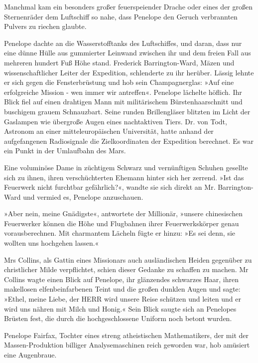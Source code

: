 \bigpar

Manchmal kam ein besonders großer feuerspeiender Drache oder eines
der großen Sternenräder dem Luftschiff so nahe, dass Penelope den
Geruch verbrannten Pulvers zu riechen glaubte.

Penelope dachte an die Wasserstofftanks des Luftschiffes, und
daran, dass nur eine dünne Hülle aus gummierter Leinwand zwischen
ihr und dem freien Fall aus mehreren hundert Fuß Höhe stand.
Frederick Barrington-Ward, Mäzen und wissenschaftlicher Leiter der
Expedition, schlenderte zu ihr herüber. Lässig lehnte er sich gegen
die Fensterbrüstung und hob sein Champagnerglas: »Auf eine
erfolgreiche Mission - wen immer wir antreffen«. Penelope lächelte
höflich. Ihr Blick fiel auf einen drahtigen Mann mit militärischem
Bürstenhaarschnitt und buschigem grauem Schnauzbart. Seine runden
Brillengläser blitzten im Licht der Gaslampen wie übergroße Augen
eines nachtaktiven Tiers. Dr. von Todt, Astronom an einer
mitteleuropäischen Universität, hatte anhand der aufgefangenen
Radiosignale die Zielkoordinaten der Expedition berechnet. Es war
ein Punkt in der Umlaufbahn des Mars.

Eine voluminöse Dame in züchtigem Schwarz und vernünftigen Schuhen
gesellte sich zu ihnen, ihren verschüchterten Ehemann hinter sich
her zerrend. »Ist das Feuerwerk nicht furchtbar gefährlich?«,
wandte sie sich direkt an Mr. Barrington-Ward und vermied es,
Penelope anzuschauen.

»Aber nein, meine Gnädigste«, antwortete der Millionär, »unsere
chinesischen Feuerwerker können die Höhe und Flugbahnen ihrer
Feuerwerkskörper genau vorausberechnen. Mit charmantem Lächeln
fügte er hinzu: »Es sei denn, sie wollten uns hochgehen lassen.«

Mrs Collins, als Gattin eines Missionars auch ausländischen Heiden
gegenüber zu christlicher Milde verpflichtet, schien dieser Gedanke
zu schaffen zu machen. Mr Collins wagte einen Blick auf Penelope,
ihr glänzendes schwarzes Haar, ihren makellosen elfenbeinfarbenen
Teint und die großen dunklen Augen und sagte: »Ethel, meine Liebe,
der HERR wird unsere Reise schützen und leiten und er wird uns
nähren mit Milch und Honig.« Sein Blick saugte sich an Penelopes
Brüsten fest, die durch die hochgeschlossene Uniform noch betont
wurden.

Penelope Fairfax, Tochter eines streng atheistischen Mathematikers,
der mit der Massen-Produktion billiger Analysemaschinen reich
geworden war, hob amüsiert eine Augenbraue.

\bigpar

